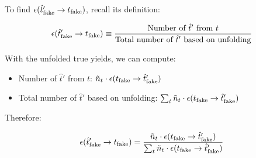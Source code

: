 To find $\misEff[\hat{t}_\text{fake}']{t_\text{fake}}$, recall its definition:

\begin{equation}
    \misEff[\hat{t}_\text{fake}']{t_\text{fake}} \equiv
        \frac{
            \text{Number of $\hat{t}'$ from $t$}
        }{
            \text{Total number of $\hat{t}'$ based on unfolding}
        }
\end{equation}

With the unfolded true yields, we can compute:

\begin{itemize}
    \item Number of $\hat{t}'$ from $t$:
        $\tilde{n}_t \cdot \misEff[t_\text{fake}]{\hat{t}_\text{fake}'}$
    \item Total number of $\hat{t}'$ based on unfolding:
        $\sum_t \tilde{n}_t \cdot \misEff[t_\text{fake}]{\hat{t}_\text{fake}'}$
\end{itemize}

Therefore:

\begin{equation}
    \misEff[\hat{t}_\text{fake}']{t_\text{fake}} =
        \frac{
            \tilde{n}_t \cdot \misEff[t_\text{fake}]{\hat{t}_\text{fake}'}
        }{
            \sum_t \tilde{n}_t \cdot \misEff[t_\text{fake}]{\hat{t}_\text{fake}'}
        }
\end{equation}
